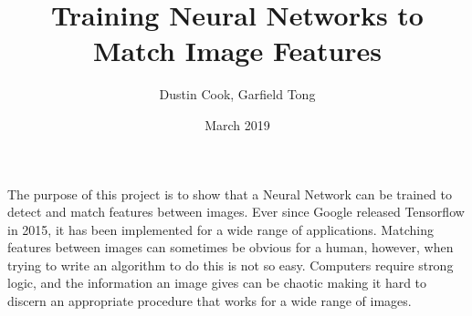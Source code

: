 \documentclass[12pt]{extarticle}
\title{Training Neural Networks to Match Image Features}
\author{Dustin Cook, Garfield Tong}
\date{March \nth{6} 2019}
\begin{document}
\maketitle

The purpose of this project is to show that a Neural Network can be trained to detect and match features between images. Ever since Google released Tensorflow in 2015, it has been implemented for a wide range of applications. Matching features between images can sometimes be obvious for a human, however, when trying to write an algorithm to do this is not so easy. Computers require strong logic, and the information an image gives can be chaotic making it hard to discern an appropriate procedure that works for a wide range of images. 
\end{document}

